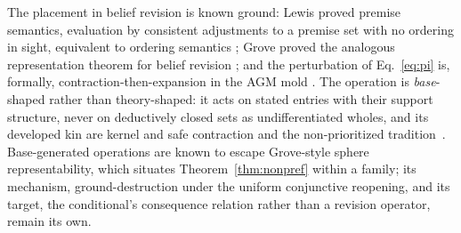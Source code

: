 The placement in belief revision is known ground: Lewis proved premise semantics, evaluation by consistent adjustments to a premise set with no ordering in sight, equivalent to ordering semantics \parencite{lewis1981}; Grove proved the analogous representation theorem for belief revision \parencite{grove1988}; and the perturbation of Eq.~\eqref{eq:pi} is, formally, contraction-then-expansion in the AGM mold \parencite{agm1985}. The operation is \emph{base}-shaped rather than theory-shaped: it acts on stated entries with their support structure, never on deductively closed sets as undifferentiated wholes, and its developed kin are kernel and safe contraction and the non-prioritized tradition~\parencite{hansson1994kernel, alchourron1985safe, rott2001change}. Base-generated operations are known to escape Grove-style sphere representability, which situates Theorem~\ref{thm:nonpref} within a family; its mechanism, ground-destruction under the uniform conjunctive reopening, and its target, the conditional's consequence relation rather than a revision operator, remain its own.

